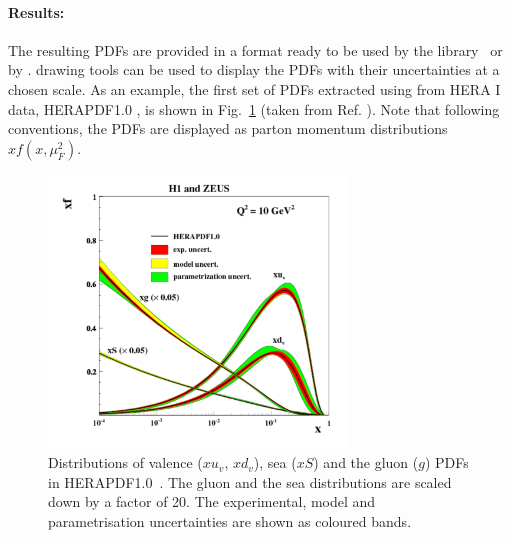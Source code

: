 \paragraph{Results:}
The resulting PDFs are provided in a format ready to be used by the \lhapdf 
library~\cite{lhapdf,lhapdfweb} or by \tmdlib \cite{Hautmann:2014kza}.
\fitter drawing tools can be used to display the PDFs with their uncertainties at a chosen scale.  
As an example, the first set of PDFs extracted using \fitter from HERA I data, HERAPDF1.0 \cite{h1zeus:2009wt}, 
is shown in Fig.~\ref{fig:hera1} (taken from Ref. \cite{h1zeus:2009wt}).
Note that following conventions, the PDFs are displayed as parton momentum distributions $xf(x,\mu_F^2)$.
\begin{figure}[!ht]
   \centering
   \includegraphics[width=8cm]{hera1.pdf}
   \caption{Distributions of valence ($xu_v$, $xd_v$), sea ($xS$) and the gluon ($g$) PDFs in HERAPDF1.0~\cite{h1zeus:2009wt}. 
       The gluon and the sea distributions are scaled down by a factor of 20.
       The experimental, model and parametrisation uncertainties are shown as coloured bands.}
 \label{fig:hera1}
\end{figure}


